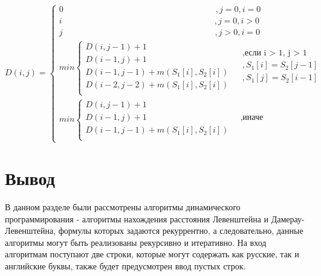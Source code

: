 \begin{equation}
	\label{eq:DL}
	D(i, j) = \begin{cases}
		0  \qquad\qquad\qquad\qquad\qquad\qquad\qquad\qquad\qquad,j = 0, i = 0\\
		i  \qquad\qquad\qquad\qquad\qquad\qquad\qquad\qquad\qquad,j = 0, i > 0\\
		j  \qquad\qquad\qquad\qquad\qquad\qquad\qquad\qquad\qquad,j > 0, i = 0\\
		min \begin{cases}
			D(i, j - 1) + 1\\
			D(i - 1, j) + 1\\
			D(i - 1, j - 1) + m(S_{1}[i], S_{2}[i]) \\
			D(i - 2, j - 2) + m(S_{1}[i], S_{2}[i]) \\
		\end{cases}
		\begin{aligned}
			& , \text{если i > 1, j > 1} \\
			& , S_{1}[i] = S_{2}[j - 1]  \\
			& , S_{1}[j] =  S_{2}[i - 1] \\
		\end{aligned}\\
		min \begin{cases}
			D(i, j - 1) + 1\\
			D(i - 1, j) + 1 & \;\; \text{,иначе}\\
			D(i - 1, j - 1) + m(S_{1}[i], S_{2}[i]) \\
		\end{cases}
	\end{cases}
\end{equation}

\section{Вывод}

В данном разделе были рассмотрены алгоритмы динамического программирования - алгоритмы нахождения расстояния Левенштейна и Дамерау-Левенштейна, формулы которых задаются рекуррентно, а следовательно, данные алгоритмы могут быть реализованы рекурсивно и итеративно. На вход алгоритмам поступают две строки, которые могут содержать как русские, так и английские буквы, также будет предусмотрен ввод пустых строк.
